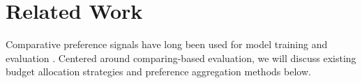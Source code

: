 
\section{Related Work}
Comparative preference signals have long been used for model training \citep{insgpt,llama2} and evaluation \citep{arena,batcheval}.
Centered around comparing-based evaluation, we will discuss existing budget allocation strategies and preference aggregation methods below.
